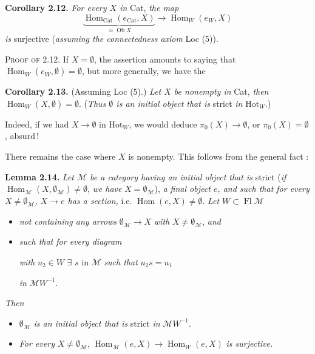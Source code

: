 \documentclass[11pt]{article}
\newcommand{\printedpage}[1]{\marginpar{\footnotesize p.~#1}}
\newcommand{\msp}[1]{\marginpar{\footnotesize [#1]}}
\newcommand{\Hom}{\operatorname{Hom}}
\newcommand{\Ob}{\operatorname{Ob}}
\newcommand{\Fl}{\operatorname{Fl}}
\newcommand{\Hot}{\mathrm{Hot}}
\newcommand{\Cat}{\mathrm{Cat}}
\begin{document}
\textbf{Corollary 2.12.} \textit{For every $X$ in} Cat, \textit{the map}
\[
\underbrace{\Hom_{\Cat}(e_{\Cat},X)}_{\simeq\Ob X}\longrightarrow\Hom_W(e_W,X)
\]
\printedpage{10}
\textit{is} surjective (\textit{assuming the connectedness axiom} Loc (5)).

\textsc{Proof of} 2.12. If $X=\emptyset$, the assertion amounts to saying that $\Hom_W(e_W,\emptyset)=\emptyset$, but more generally, we have the

\textbf{Corollary 2.13.} (Assuming Loc (5).) \textit{Let $X$ be nonempty in} Cat, \textit{then} $\Hom_W(X,\emptyset)=\emptyset$. (\textit{Thus $\emptyset$ is an initial object that is} strict \textit{in} $\Hot_W$.)

Indeed, if we had $X\longrightarrow\emptyset$ in $\Hot_W$,
\msp{page 13'}
we would deduce $\pi_0(X)\longrightarrow\emptyset$, or $\pi_0(X)=\emptyset$, absurd\,!

There remains the case where $X$ is nonempty. This follows from the general fact :

\textbf{Lemma 2.14.} \textit{Let $\mathcal{M}$ be a category having an initial object that is} strict (\textit{if} $\Hom_{\mathcal{M}}(X,\emptyset_{\mathcal{M}})\neq\emptyset$, \textit{we have} $X=\emptyset_{\mathcal{M}}$), \textit{a final object $e$, and such that for every $X\neq\emptyset_{\mathcal{M}}$, $X\longrightarrow e$ has a section,} i.e. $\Hom(e,X)\neq\emptyset$. \textit{Let} $W\subset\Fl\mathcal{M}$
\begin{itemize}[leftmargin=3em,labelwidth=2.5em,align=right]
\item[1$^{\circ}$)] \textit{not containing any arrows} $\emptyset_{\mathcal{M}}\longrightarrow X$ \textit{with} $X\neq\emptyset_{\mathcal{M}}$, \textit{and}
\item[2\,$^{\circ}$)] \textit{such that for every diagram}
\textit{with} $u_2\in W$ $\exists$ $s$ in $\mathcal{M}$ \textit{such that} $u_2s=u_1$

\textit{in} $\mathcal{M}W^{-1}$.
\end{itemize}
\textit{Then}
\begin{itemize}[leftmargin=3em,labelwidth=2.5em,align=right]
\item[a)] $\emptyset_{\mathcal{M}}$ \textit{is an initial object that is} strict \textit{in} $\mathcal{M}W^{-1}$.
\item[b)] \textit{For every} $X\neq\emptyset_{\mathcal{M}}$, $\Hom_{\mathcal{M}}(e,X)\longrightarrow\Hom_W(e,X)$ \textit{is surjective.}
\end{itemize}
\end{document}
